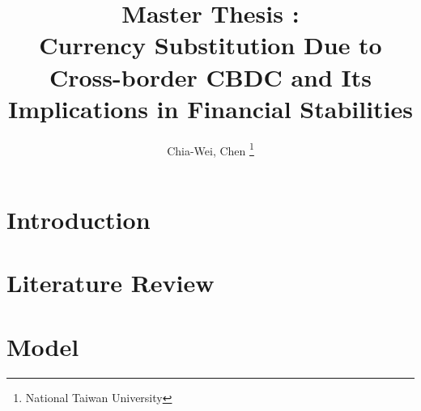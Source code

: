 \documentclass[11pt, a4paper]{article}
\title{Master Thesis : \\ 
Currency Substitution Due to Cross-border CBDC and Its Implications in Financial Stabilities}
\author{Chia-Wei, Chen \thanks{National Taiwan University}}
\theoremstyle{definition}
\begin{document}
    \maketitle
    \begin{abstract}
        
    \end{abstract}


    \section{Introduction}
    
    \section{Literature Review}
    
    \section{Model}
     


    
    
\end{document}
